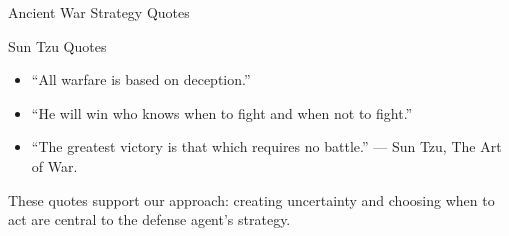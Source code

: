 \documentclass[aspectratio=169,xcolor=dvipsnames]{beamer}
\begin{document}
\begin{frame}{Ancient War Strategy Quotes}
\begin{block}{Sun Tzu Quotes}
\small
\begin{itemize}
  \item ``All warfare is based on deception.''
  \item ``He will win who knows when to fight and when not to fight.''
  \item ``The greatest victory is that which requires no battle.'' --- Sun Tzu, The Art of War.
\end{itemize}
\end{block}

\vspace{6pt}
\small These quotes support our approach: creating uncertainty and choosing when to act are central to the defense agent's strategy.
\end{frame}


\end{document}
